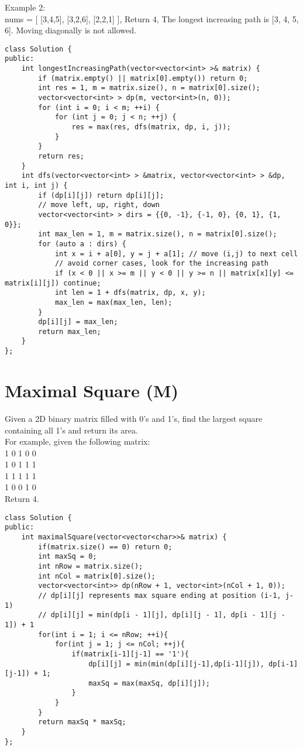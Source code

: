 Example 2:\\
nums = [
  [3,4,5],
  [3,2,6],
  [2,2,1]
],
Return 4,
The longest increasing path is [3, 4, 5, 6]. Moving diagonally is not allowed.\\

\begin{lstlisting}
class Solution {
public:
    int longestIncreasingPath(vector<vector<int> >& matrix) {
        if (matrix.empty() || matrix[0].empty()) return 0;
        int res = 1, m = matrix.size(), n = matrix[0].size();
        vector<vector<int> > dp(m, vector<int>(n, 0));
        for (int i = 0; i < m; ++i) {
            for (int j = 0; j < n; ++j) {
                res = max(res, dfs(matrix, dp, i, j));
            }
        }
        return res;
    }
    int dfs(vector<vector<int> > &matrix, vector<vector<int> > &dp, int i, int j) {
        if (dp[i][j]) return dp[i][j];
        // move left, up, right, down
        vector<vector<int> > dirs = {{0, -1}, {-1, 0}, {0, 1}, {1, 0}}; 
        int max_len = 1, m = matrix.size(), n = matrix[0].size();
        for (auto a : dirs) {
            int x = i + a[0], y = j + a[1]; // move (i,j) to next cell
            // avoid corner cases, look for the increasing path
            if (x < 0 || x >= m || y < 0 || y >= n || matrix[x][y] <= matrix[i][j]) continue;
            int len = 1 + dfs(matrix, dp, x, y);
            max_len = max(max_len, len);
        }
        dp[i][j] = max_len;
        return max_len;
    }
};
\end{lstlisting}


\section{Maximal Square (M)}
Given a 2D binary matrix filled with 0's and 1's, find the largest square containing all 1's and return its area.\\

For example, given the following matrix:\\
1 0 1 0 0\\
1 0 1 1 1\\
1 1 1 1 1\\
1 0 0 1 0\\
Return 4.\\

\begin{lstlisting}
class Solution {
public:
    int maximalSquare(vector<vector<char>>& matrix) {
        if(matrix.size() == 0) return 0;
        int maxSq = 0;
        int nRow = matrix.size();
        int nCol = matrix[0].size();
        vector<vector<int>> dp(nRow + 1, vector<int>(nCol + 1, 0));
        // dp[i][j] represents max square ending at position (i-1, j-1)
        // dp[i][j] = min(dp[i - 1][j], dp[i][j - 1], dp[i - 1][j - 1]) + 1
        for(int i = 1; i <= nRow; ++i){
            for(int j = 1; j <= nCol; ++j){
                if(matrix[i-1][j-1] == '1'){
                    dp[i][j] = min(min(dp[i][j-1],dp[i-1][j]), dp[i-1][j-1]) + 1;
                    maxSq = max(maxSq, dp[i][j]);
                }   
            }
        }
        return maxSq * maxSq;      
    }
};
\end{lstlisting}


